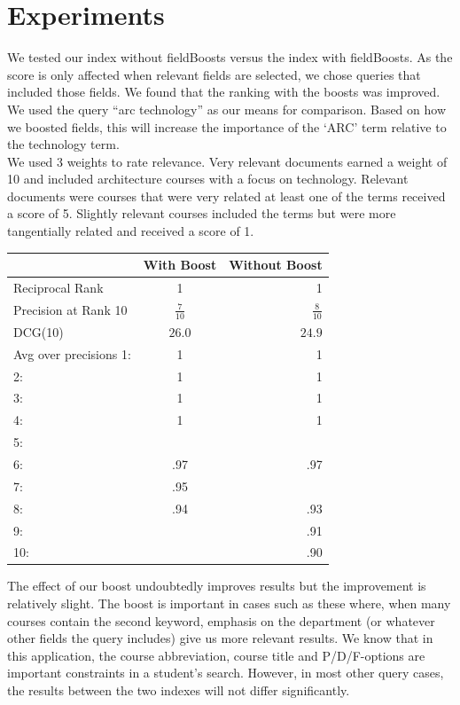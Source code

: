 \documentclass[12pt,letterpaper]{article}
\begin{document}
\section{Experiments}

We tested our index without fieldBoosts versus the index with fieldBoosts. As the score is only affected when relevant fields are selected, we chose queries that included those fields. We found that the ranking with the boosts was improved. We used the query ``arc technology'' as our means for comparison. Based on how we boosted fields, this will increase the importance of the `ARC' term relative to the technology term. \\

We used 3 weights to rate relevance. Very relevant documents earned a weight of 10 and included architecture courses with a focus on technology. Relevant documents were courses that were very related at least one of the terms received a score of 5. Slightly relevant courses included the terms but were more tangentially related and received a score of 1. 

\begin{tabular}{ | l | c | r |}
	\hline
		& With Boost & Without Boost\\
	\hline
	Reciprocal Rank 			 & 1 & 1\\
	Precision at Rank 10 & $\frac{7}{10}$ & $\frac{8}{10}$ \\
	DCG(10) 								& $26.0$ & $24.9$ \\
	Avg over precisions 1: & 1 	& 1 \\
	2: 										& 1 	& 1 \\
	3: 										& 1 	& 1 \\
	4: 										& 1 	& 1 \\
	5: 										& 		&   \\
	6: 										& .97 & .97\\
	7: 										& .95 & 	 \\
	8: 										& .94 & .93 \\
	9: 										& 		& .91 \\
	10: 									&	 		& .90 \\	
	\hline 
\end{tabular}

\vspace{1 cm}

The effect of our boost undoubtedly improves results but the improvement is relatively slight. The boost is important in cases such as these where, when many courses contain the second keyword, emphasis on the department (or whatever other fields the query includes) give us more relevant results. We know that in this application, the course abbreviation, course title and P/D/F-options are important constraints in a student's search. However, in most other query cases, the results between the two indexes will not differ significantly. 
\end{document}
